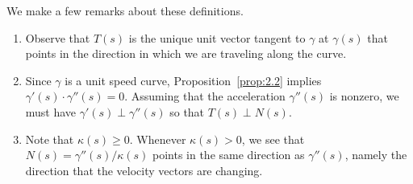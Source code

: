 We make a few remarks about these definitions.
\begin{enumerate}[(1)]
    \item Observe that $T(s)$ is the unique unit vector tangent to $\gamma$ 
    at $\gamma(s)$ that points in the direction in which we are traveling 
    along the curve.

    \item Since $\gamma$ is a unit speed curve, Proposition~\ref{prop:2.2}
    implies $\gamma'(s) \cdot \gamma''(s) = 0$. Assuming that the 
    acceleration $\gamma''(s)$ is nonzero, we must have 
    $\gamma'(s) \perp \gamma''(s)$ so that $T(s) \perp N(s)$. 

    \item Note that $\kappa(s) \geq 0$. Whenever $\kappa(s) > 0$, 
    we see that $N(s) = \gamma''(s)/\kappa(s)$ points in the same 
    direction as $\gamma''(s)$, namely the direction that the velocity 
    vectors are changing.
\end{enumerate}


